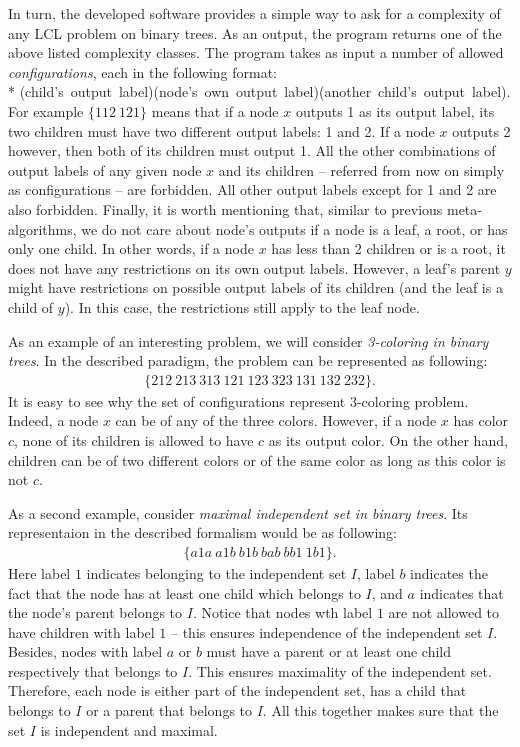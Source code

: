 In turn, the developed software provides a simple way to ask for a complexity
of any LCL problem on binary trees. As an output, the program returns
one of the above listed complexity classes. The program takes as input a
number of allowed \emph{configurations}, each in the following format:\\*
\mbox{(child's~output~label)(node's~own~output~label)(another~child's~output~label)}.
For example $\{112~121\}$ means that if a node $x$ outputs 1 as its output label,
its two children must have two different output labels: 1 and 2. If
a node $x$ outputs 2 however, then both of its children must output 1.
All the other combinations of output labels of any given node $x$ and
its children -- referred from now on simply as configurations --
are forbidden. All other output labels except for 1 and 2 are also
forbidden. Finally, it is worth mentioning that, similar to previous
meta-algorithms, we do not care about node's outputs if a node is a leaf,
a root, or has only one child. In other words, if a node $x$ has less than
2 children or is a root, it
does not have any restrictions on its own output labels. However, a leaf's parent $y$ might have restrictions on possible output labels of its children
(and the leaf is a child of $y$). In this case, the restrictions still
apply to the leaf node.

As an example of an interesting problem, we will consider
\emph{3-coloring in binary trees}. In the described paradigm,
the problem can be represented as following:
\begin{align*}
  \{212~213~313~121~123~323~131~132~232\}.
\end{align*}
It is easy to see why the set of configurations represent
3-coloring problem. Indeed, a node $x$ can be of any of the three
colors. However, if a node $x$ has color $c$, none of its
children is allowed to have $c$ as its output color. On the
other hand, children can be of two different colors or of the same
color as long as this color is not $c$.

As a second example, consider \emph{maximal independent set in
binary trees}. Its representaion in the described formalism would be
as following:
\begin{align*}
  \{a1a~a1b~b1b~bab~bb1~1b1\}.
\end{align*}
Here label $1$ indicates belonging to the independent set $I$, label $b$
indicates the fact that the node has at least one child which belongs to
$I$, and $a$ indicates that the node's parent belongs to $I$.
Notice that nodes wth label $1$ are not allowed to have children with
label $1$ -- this ensures independence of the independent set $I$.
Besides, nodes with label $a$ or $b$ must have a parent or at least one
child respectively that belongs to $I$. This ensures maximality of the
independent set.
Therefore,
each node is either part of the independent set, has a child that belongs
to $I$ or a parent that belongs to $I$. All this together makes sure
that the set $I$ is independent and maximal.


